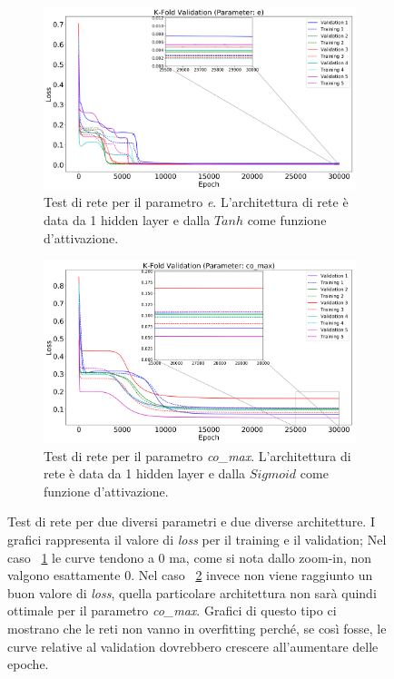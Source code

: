 \documentclass[12pt,a4paper,final]{book}
\begin{document}
\begin{figure}[!ht]
\centering
	\begin{subfigure}{\textwidth}
	    \centering
	    \includegraphics[width=0.8\linewidth]{../figures/validation_e_zoom.png}
	    \caption{Test di rete per il parametro \textit{e}. L'architettura di rete è data da 1 hidden layer e dalla $Tanh$ come funzione d'attivazione.}
	    \label{test1}
	\end{subfigure}
	\newline
	\begin{subfigure}{\textwidth}
		\centering
	    \includegraphics[width=0.8\linewidth]{../figures/validation_co_max_zoom.png}
		\caption{Test di rete per il parametro \textit{co\_max}. L'architettura di rete è data da 1 hidden layer e dalla $Sigmoid$ come funzione d'attivazione.}
		\label{test2}
	\end{subfigure}
	\caption{Test di rete per due diversi parametri e due diverse architetture. I grafici rappresenta il valore di \textit{loss} per il training e il validation; Nel caso ~\ref{test1} le curve tendono a 0 ma, come si nota dallo zoom-in, non valgono esattamente 0. Nel caso ~\ref{test2} invece non viene raggiunto un buon valore di \textit{loss}, quella particolare architettura non sarà quindi ottimale per il parametro \textit{co\_max}. Grafici di questo tipo ci mostrano che le reti non vanno in overfitting perché, se così fosse, le curve relative al validation dovrebbero crescere all'aumentare delle epoche.}
	\label{test_rete}
\end{figure}
\end{document}
